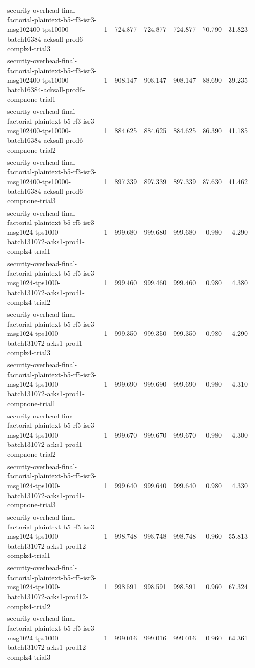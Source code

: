 \begin{tabular}{lrrrrrr}
security-overhead-final-factorial-plaintext-b5-rf3-isr3-msg102400-tps10000-batch16384-acksall-prod6-complz4-trial3 & 1 & 724.877 & 724.877 & 724.877 & 70.790 & 31.823 \\
security-overhead-final-factorial-plaintext-b5-rf3-isr3-msg102400-tps10000-batch16384-acksall-prod6-compnone-trial1 & 1 & 908.147 & 908.147 & 908.147 & 88.690 & 39.235 \\
security-overhead-final-factorial-plaintext-b5-rf3-isr3-msg102400-tps10000-batch16384-acksall-prod6-compnone-trial2 & 1 & 884.625 & 884.625 & 884.625 & 86.390 & 41.185 \\
security-overhead-final-factorial-plaintext-b5-rf3-isr3-msg102400-tps10000-batch16384-acksall-prod6-compnone-trial3 & 1 & 897.339 & 897.339 & 897.339 & 87.630 & 41.462 \\
security-overhead-final-factorial-plaintext-b5-rf5-isr3-msg1024-tps1000-batch131072-acks1-prod1-complz4-trial1 & 1 & 999.680 & 999.680 & 999.680 & 0.980 & 4.290 \\
security-overhead-final-factorial-plaintext-b5-rf5-isr3-msg1024-tps1000-batch131072-acks1-prod1-complz4-trial2 & 1 & 999.460 & 999.460 & 999.460 & 0.980 & 4.380 \\
security-overhead-final-factorial-plaintext-b5-rf5-isr3-msg1024-tps1000-batch131072-acks1-prod1-complz4-trial3 & 1 & 999.350 & 999.350 & 999.350 & 0.980 & 4.290 \\
security-overhead-final-factorial-plaintext-b5-rf5-isr3-msg1024-tps1000-batch131072-acks1-prod1-compnone-trial1 & 1 & 999.690 & 999.690 & 999.690 & 0.980 & 4.310 \\
security-overhead-final-factorial-plaintext-b5-rf5-isr3-msg1024-tps1000-batch131072-acks1-prod1-compnone-trial2 & 1 & 999.670 & 999.670 & 999.670 & 0.980 & 4.300 \\
security-overhead-final-factorial-plaintext-b5-rf5-isr3-msg1024-tps1000-batch131072-acks1-prod1-compnone-trial3 & 1 & 999.640 & 999.640 & 999.640 & 0.980 & 4.330 \\
security-overhead-final-factorial-plaintext-b5-rf5-isr3-msg1024-tps1000-batch131072-acks1-prod12-complz4-trial1 & 1 & 998.748 & 998.748 & 998.748 & 0.960 & 55.813 \\
security-overhead-final-factorial-plaintext-b5-rf5-isr3-msg1024-tps1000-batch131072-acks1-prod12-complz4-trial2 & 1 & 998.591 & 998.591 & 998.591 & 0.960 & 67.324 \\
security-overhead-final-factorial-plaintext-b5-rf5-isr3-msg1024-tps1000-batch131072-acks1-prod12-complz4-trial3 & 1 & 999.016 & 999.016 & 999.016 & 0.960 & 64.361 \\

\end{tabular}
